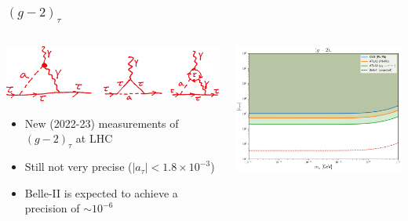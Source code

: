 \documentclass[mathserif, 10pt, aspectratio=169]{beamer}
\begin{document}
\begin{frame}\frametitle{$(g-2)_\tau$}
    \begin{columns}
        \begin{column}{0.5\textwidth}
            \begin{center}
                \includegraphics[width=\columnwidth]{figures/g2tau.png}
            \end{center}
            \begin{itemize}
                \item New (2022-23) measurements of $(g-2)_\tau$ at LHC
                \item Still not very precise ($|a_\tau|<1.8\times 10^{-3}$)
                \item  Belle-II is expected to achieve a precision of $\sim 10^{-6}$
            \end{itemize}
        \end{column}
        \begin{column}{0.47\textwidth}
            \includegraphics[width=\columnwidth]{figures/g2tau_lim.png}
        \end{column}
    \end{columns}
    
    
\end{frame}
\end{document}
